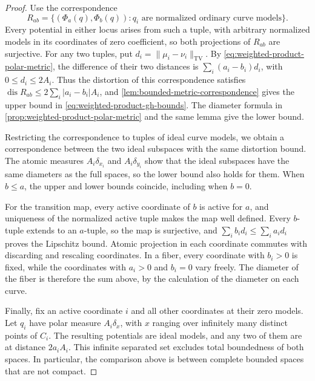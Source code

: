 \begin{proof}
Use the correspondence
\[
 R_{ab}=\{(\Phi_a(q),\Phi_b(q)):q_i
                \text{ are normalized ordinary curve models}\}.
\]
Every potential in either locus arises from such a tuple, with arbitrary normalized models in its coordinates of zero coefficient, so both projections of $R_{ab}$ are surjective. For any two tuples, put $d_i=\|\mu_i-\nu_i\|_{\mathrm{TV}}$. By \eqref{eq:weighted-product-polar-metric}, the difference of their two distances is $\sum_i(a_i-b_i)d_i$, with $0\leq d_i\leq2A_i$. Thus the distortion of this correspondence satisfies $\operatorname{dis}R_{ab}\leq2\sum_i|a_i-b_i|A_i$, and \cref{lem:bounded-metric-correspondence} gives the upper bound in \eqref{eq:weighted-product-gh-bounds}. The diameter formula in \cref{prop:weighted-product-polar-metric} and the same lemma give the lower bound.

Restricting the correspondence to tuples of ideal curve models, we obtain a correspondence between the two ideal subspaces with the same distortion bound. The atomic measures $A_i\delta_{x_i}$ and $A_i\delta_{y_i}$ show that the ideal subspaces have the same diameters as the full spaces, so the lower bound also holds for them. When $b\leq a$, the upper and lower bounds coincide, including when $b=0$.

For the transition map, every active coordinate of $b$ is active for $a$, and uniqueness of the normalized active tuple makes the map well defined. Every $b$-tuple extends to an $a$-tuple, so the map is surjective, and $\sum_i b_i d_i\leq\sum_i a_i d_i$ proves the Lipschitz bound. Atomic projection in each coordinate commutes with discarding and rescaling coordinates. In a fiber, every coordinate with $b_i>0$ is fixed, while the coordinates with $a_i>0$ and $b_i=0$ vary freely. The diameter of the fiber is therefore the sum above, by the calculation of the diameter on each curve.

Finally, fix an active coordinate $i$ and all other coordinates at their zero models. Let $q_i$ have polar measure $A_i\delta_x$, with $x$ ranging over infinitely many distinct points of $C_i$. The resulting potentials are ideal models, and any two of them are at distance $2a_iA_i$. This infinite separated set excludes total boundedness of both spaces. In particular, the comparison above is between complete bounded spaces that are not compact.
\end{proof}
